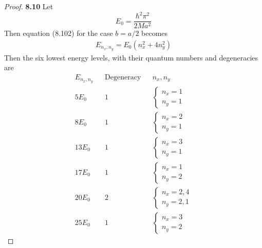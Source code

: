\documentclass[11pt]{article}
\theoremstyle{definition}
\begin{document}
\cleardoublepage
\begin{proof}{\textbf{8.10}}
Let
$$E_0 = \frac{\hbar^2\pi^2}{2Ma^2}$$
Then equation (8.102) for the case $b = a/2$ becomes
\begin{align*}
    E_{n_x,n_y} = E_0(n_x^2 + 4n_y^2)
\end{align*}
Then the six lowest energy levels, with their quantum numbers and degeneracies
are
\begin{align*}
    E_{n_x, n_y} & &\text{Degeneracy}& &n_x, n_y\\
    5E_0&  &1&  &\begin{cases} n_x = 1\\ n_y = 1 \end{cases}\\
    8E_0&  &1&  &\begin{cases} n_x = 2\\ n_y = 1 \end{cases}\\
    13E_0&  &1&  &\begin{cases} n_x = 3\\ n_y = 1 \end{cases}\\
    17E_0&  &1&  &\begin{cases} n_x = 1\\ n_y = 2 \end{cases}\\
    20E_0&  &2&  &\begin{cases} n_x = 2,4\\ n_y = 2,1 \end{cases}\\
    25E_0&  &1&  &\begin{cases} n_x = 3\\ n_y = 2 \end{cases}   
\end{align*}
\end{proof}
\end{document}
